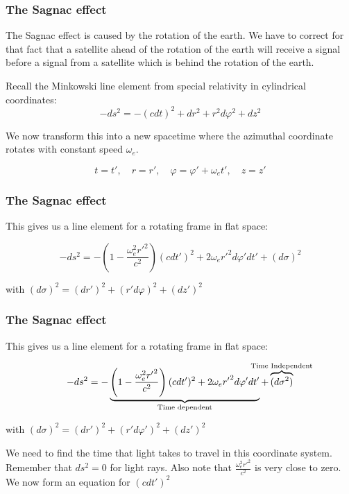 \documentclass[xcolor=dvipsnames,usepdftitle=false]{beamer}
\renewcommand\phi{\varphi}
\begin{document}
\begin{frame}

\frametitle{The Sagnac effect}

The Sagnac effect is caused by the rotation of the earth. We have to correct for that fact that a satellite ahead of the rotation of the earth will receive a signal before a signal from a satellite which is behind the rotation of the earth.

Recall the Minkowski line element from special relativity in cylindrical coordinates: \[ -ds^2 = -(c dt)^2 + dr^2 + r^2 d\phi^2 + dz^2 \]

We now transform this into a new spacetime where the azimuthal coordinate rotates with constant speed $\omega_{e}$.

\[ t = t' , \,\,\,\,\,\, r=r', \,\,\,\,\,\, \phi = \phi' + \omega_{e} t', \,\,\,\,\,\, z = z' \]

\end{frame}

\begin{frame}

\frametitle{The Sagnac effect}

This gives us a line element for a rotating frame in flat space:

\[-ds^2 = - \left(1- \frac{\omega_{e}^2 {r'}^2}{c^2}\right)(cdt')^2 + 2 \omega_{e} {r'}^2 d\phi' dt' + (d\sigma)^2\]

\vspace{\baselineskip}

with $(d\sigma)^2 = (dr')^2 + (r' d \phi)^2 + (dz')^2$

\end{frame}

\begin{frame}

\frametitle{The Sagnac effect}

This gives us a line element for a rotating frame in flat space:

\[-ds^2 = - \underbrace{\left(1- \frac{\omega_{e}^2 {r'}^2}{c^2}\right)(cdt')^2 + 2 \omega_{e} {r'}^2 d\phi' dt'}_{\text{Time dependent}} + \overbrace{(d\sigma^2)}^{\mathclap{\text{Time Independent}}}\]

\vspace{\baselineskip}

with $(d\sigma)^2 = (dr')^2 + (r' d \phi')^2 + (dz')^2$ 

\vspace{\baselineskip}

We need to find the time that light takes to travel in this coordinate system. Remember that $ds^2 = 0$ for light rays. Also note that $\frac{\omega_{e}^2 {r'}^2}{c^2}$ is very close to zero. We now form an equation for $(cdt')^2$

\end{frame}
\end{document}
